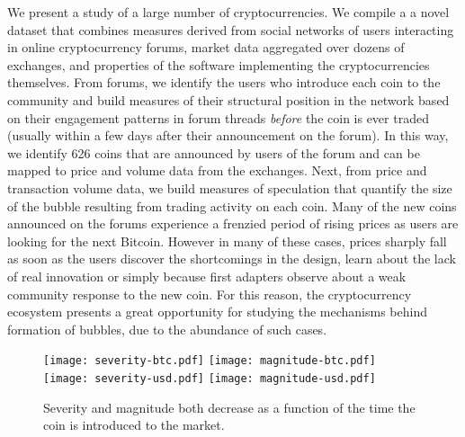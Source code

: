 We present a study of a large number of cryptocurrencies.
We compile a a novel dataset that combines measures derived from social networks of users interacting in online cryptocurrency forums, market data aggregated over dozens of exchanges, and properties of the software implementing the cryptocurrencies themselves.
From forums, we identify the users who introduce each coin to the community and build measures of their structural position in the network based on
their engagement patterns in forum threads \emph{before} the coin is ever traded (usually within a few days after their announcement on the forum).
In this way, we identify 626 coins that are announced by users of the forum and can be mapped to price and volume data from the exchanges.
Next, from price and transaction volume data, we build measures of speculation that quantify the size of the bubble resulting from trading activity on each coin. 
Many of the new coins announced on the forums experience a frenzied period of rising prices as users are looking for the next Bitcoin. However in many of these cases, prices sharply fall as soon as the users discover the shortcomings in the design, learn about the lack of real innovation or simply because first adapters observe about a weak community response to the new coin. For this reason, the cryptocurrency ecosystem presents a great opportunity for studying the mechanisms behind formation of bubbles, due to the abundance of such cases.


\begin{figure}
\centering
\texttt{[image: severity-btc.pdf]}
\texttt{[image: magnitude-btc.pdf]}
\\
\texttt{[image: severity-usd.pdf]}
\texttt{[image: magnitude-usd.pdf]}
\caption{Severity and magnitude both decrease as a function of the time the coin is introduced to the market.}
\label{severity_boxplot}
\end{figure}

